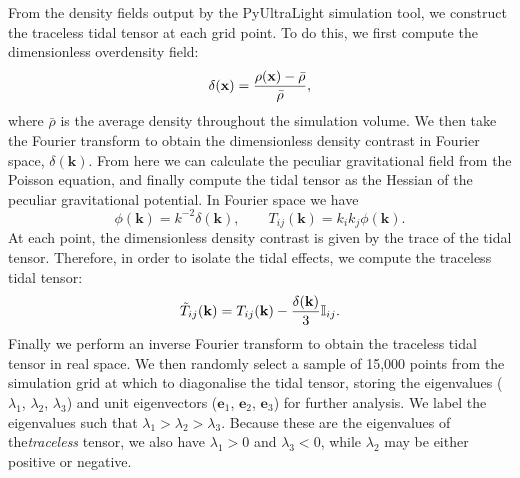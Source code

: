 \documentclass[a4paper,11pt]{article}
\begin{document}
From the density fields output by the {\sc PyUltraLight} simulation tool, we construct the traceless tidal tensor at each grid point. To do this, we first compute the dimensionless overdensity field:
\begin{equation}
    \delta(\mathrm{\mathbf{x}}) = \frac{\rho(\mathrm{\mathbf{x}})-\Bar{\rho}}{\bar{\rho}}, 
\end{equation}
where $\bar{\rho}$ is the average density throughout the simulation volume. We then take the Fourier transform to obtain the dimensionless density contrast in Fourier space, $\delta(\mathrm{\mathbf{k}})$. From here we can calculate the peculiar gravitational field from the Poisson equation, and finally compute the tidal tensor as the Hessian of the peculiar gravitational potential. In Fourier space we have
\begin{equation}
    \phi(\mathrm{\mathbf{k}}) = k^{-2}\delta(\mathrm{\mathbf{k}}), \qquad T_{ij}(\mathrm{\mathbf{k}}) = k_{i}k_{j}\phi(\mathrm{\mathbf{k}}).
\end{equation}
At each point, the dimensionless density contrast is given by the trace of the tidal tensor. Therefore, in order to isolate the tidal effects, we compute the traceless tidal tensor:
\begin{equation}
    \Tilde{T}_{ij}(\mathrm{\mathbf{k}}) = T_{ij}(\mathrm{\mathbf{k}}) - \frac{\delta(\mathrm{\mathbf{k}})}{3}\mathbb{I}_{ij}.
\end{equation}
Finally we perform an inverse Fourier transform to obtain the traceless tidal tensor in real space. We then randomly select a sample of 15,000 points from the simulation grid at which to diagonalise the tidal tensor, storing the eigenvalues ($\lambda_1$, $\lambda_2$, $\lambda_3$) and unit eigenvectors ($\mathrm{\mathbf{e}}_1$, $\mathrm{\mathbf{e}}_2$, $\mathrm{\mathbf{e}}_3$) for further analysis. We label the eigenvalues such that $\lambda_1 >\lambda_2 > \lambda_3$. Because these are the eigenvalues of the\textit{traceless} tensor, we also have $\lambda_1>0$ and  $\lambda_3 < 0$, while $\lambda_2$ may be either positive or negative.
\end{document}
